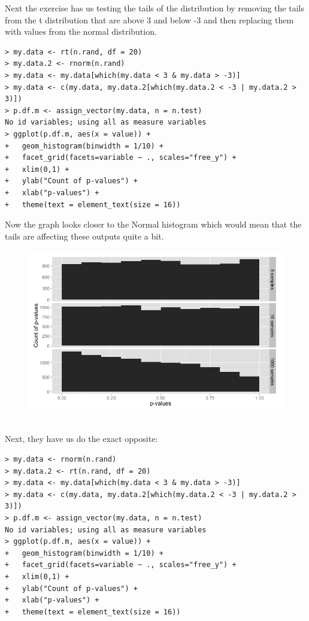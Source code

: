 \documentclass[10pt]{article}
\begin{document}
Next the exercise has us testing the tails of the distribution by removing the tails from the t distribution that are above 3 and below -3 and then replacing them with values from the normal distribution.
\begin{verbatim}
> my.data <- rt(n.rand, df = 20)
> my.data.2 <- rnorm(n.rand)
> my.data <- my.data[which(my.data < 3 & my.data > -3)]
> my.data <- c(my.data, my.data.2[which(my.data.2 < -3 | my.data.2 > 3)])
> p.df.m <- assign_vector(my.data, n = n.test)
No id variables; using all as measure variables
> ggplot(p.df.m, aes(x = value)) + 
+   geom_histogram(binwidth = 1/10) + 
+   facet_grid(facets=variable ~ ., scales="free_y") + 
+   xlim(0,1) +
+   ylab("Count of p-values") +
+   xlab("p-values") +
+   theme(text = element_text(size = 16))
\end{verbatim}
Now the graph looks closer to the Normal histogram which would mean that the tails are affecting these outputs quite a bit. 
\pagebreak
\begin{figure}[!h]
\includegraphics[scale=0.37]{tDistNormalTails.png}
\centering
\end{figure}\\
Next, they have us do the exact opposite:
\begin{verbatim}
> my.data <- rnorm(n.rand)
> my.data.2 <- rt(n.rand, df = 20)
> my.data <- my.data[which(my.data < 3 & my.data > -3)]
> my.data <- c(my.data, my.data.2[which(my.data.2 < -3 | my.data.2 > 3)])
> p.df.m <- assign_vector(my.data, n = n.test)
No id variables; using all as measure variables
> ggplot(p.df.m, aes(x = value)) + 
+   geom_histogram(binwidth = 1/10) + 
+   facet_grid(facets=variable ~ ., scales="free_y") + 
+   xlim(0,1) +
+   ylab("Count of p-values") +
+   xlab("p-values") +
+   theme(text = element_text(size = 16))
\end{verbatim}
\end{document}
